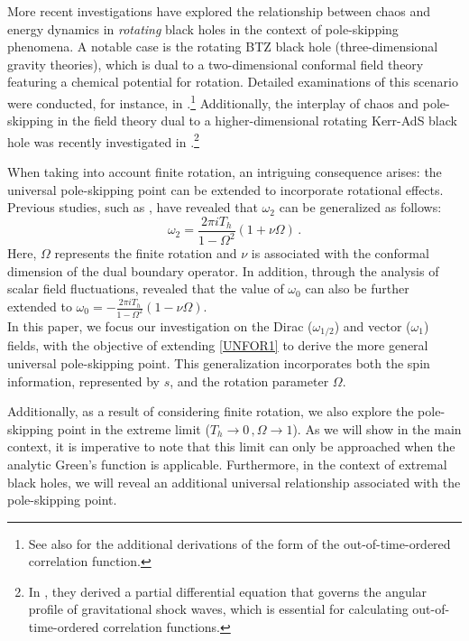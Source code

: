 \documentclass[11pt,a4paper]{article}
\begin{document}
More recent investigations have explored the relationship between chaos and energy dynamics in \textit{rotating} black holes in the context of pole-skipping phenomena. A notable case is the rotating BTZ black hole (three-dimensional gravity theories), which is dual to a two-dimensional conformal field theory featuring a chemical potential for rotation. Detailed examinations of this scenario were conducted, for instance, in \cite{Liu:2020yaf}.\footnote{See also \cite{Craps:2021bmz,Jahnke:2019gxr} for the additional derivations of the form of the out-of-time-ordered correlation function.} Additionally, the interplay of chaos and pole-skipping in the field theory dual to a higher-dimensional rotating Kerr-AdS black hole was recently investigated in \cite{Blake:2021hjj,Amano:2022mlu}.\footnote{In \cite{Blake:2021hjj,Amano:2022mlu}, they derived a partial differential equation that governs the angular profile of gravitational shock waves, which is essential for calculating out-of-time-ordered correlation functions.}

When taking into account finite rotation, an intriguing consequence arises: the universal pole-skipping point can be extended to incorporate rotational effects. Previous studies, such as \cite{Liu:2020yaf,Blake:2021hjj,Amano:2022mlu}, have revealed that $\omega_2$ can be generalized as follows:
%
\begin{equation} \label{UNFOR2}
    \omega_{2}=\frac{2\pi i T_h}{1-\Omega^2} \left( 1 + \nu \Omega \right)\,.
\end{equation}
%
Here, $\Omega$ represents the finite rotation and $\nu$ is associated with the conformal dimension of the dual boundary operator. 
In addition, through the analysis of scalar field fluctuations, \cite{Natsuume:2020snz} revealed that the value of $\omega_0$ can also be further extended to $\omega_{0}=-\frac{2\pi i T_h}{1-\Omega^2} \left( 1 - \nu \Omega \right)$.\\

In this paper, we focus our investigation on the Dirac ($\omega_{1/2}$) and vector ($\omega_{1}$) fields, with the objective of extending \eqref{UNFOR1} to derive the more general universal pole-skipping point. This generalization incorporates both the spin information, represented by $s$, and the rotation parameter $\Omega$.

Additionally, as a result of considering finite rotation, we also explore the pole-skipping point in the extreme limit ($T_h\rightarrow 0\,, \Omega\rightarrow 1$). As we will show in the main context, it is imperative to note that this limit can only be approached when the analytic Green's function is applicable. Furthermore, in the context of extremal black holes, we will reveal an additional universal relationship associated with the pole-skipping point.\\
\end{document}
